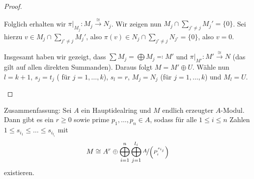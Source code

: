 \documentclass[12pt,a4paper]{scrartcl}
\theoremstyle{cplain}
\theoremstyle{cdef}
\begin{document}
\begin{proof}
\begin{description}
		Folglich erhalten wir $\pi|_{M_j}\colon M_j\xrightarrow{\cong} N_j$. Wir zeigen nun $M_j\cap \sum_{j'\neq j} M_j' = \{0\}$. Sei hierzu $v\in M_j\cap\sum_{j'\neq j} M_j'$, also $\pi(v) \in N_j\cap\sum_{j'\neq j} N_{j'} = \{0\}$, also $v = 0$.
		
		Insgesamt haben wir gezeigt, dass $\sum M_j = \bigoplus M_j \eqqcolon M'$ und $\pi|_{M'}\colon M'\xrightarrow{\cong} N$ (das gilt auf allen direkten Summanden). Daraus folgt $M = M'\oplus U$. Wähle nun $l = k+1$, $s_j  = t_j$ ( für $j = 1,\dots, k$), $s_l = r$, $M_j = N_j$ (für $j = 1,\dots, k$) und $M_l = U$.
		\qedhere
	\end{description}
\end{proof}

Zusammenfassung: Sei $A$ ein Hauptidealring und $M$ endlich erzeugter $A$-Modul. Dann gibt es ein $r\ge 0$ sowie prime $p_1,\dots, p_n\in A$, sodass für alle $1 \le i \le n$ Zahlen $1 \le s_{i_1} \le \dots \le s_{i_{l_i}}$ mit
\[M\cong A^r\oplus \bigoplus_{i = 1}^n\bigoplus_{j = 1}^{l_i} \nicefrac{A}{\left(P_i^{s_{i_j}}\right)}\]
existieren.
\end{document}
